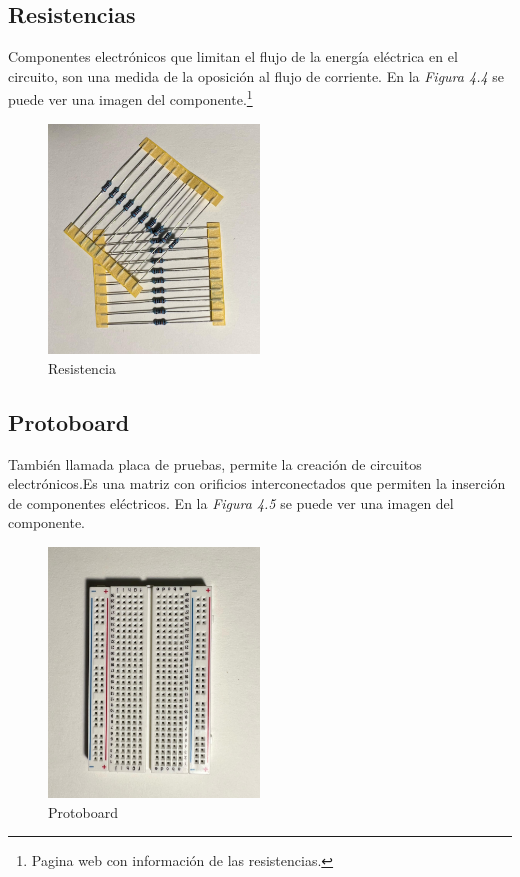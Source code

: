 \subsection{Resistencias}
Componentes electrónicos que limitan el flujo de la energía eléctrica en el circuito, son una medida de la oposición al flujo de corriente.  En la \textit{Figura 4.4} se puede ver una imagen del componente.\cite{Resistencia}\footnote{Pagina web con información de las resistencias\cite{Resistencia}.}
\begin{figure}[h]
        \centering
        \includegraphics[width=0.5\textwidth]{img/Resistencias.png}
        \caption{Resistencia}
        \label{fig:activforce}
    \end{figure}
    
\subsection{Protoboard}
También llamada placa de pruebas, permite la creación de circuitos electrónicos.Es una matriz con orificios interconectados que permiten la inserción de componentes eléctricos. En la \textit{Figura 4.5} se puede ver una imagen del componente.
\begin{figure}[h]
        \centering
        \includegraphics[angle=90,width=0.5\textwidth]{img/Protoboard.png}
        \caption{Protoboard}
        \label{fig:activforce}
    \end{figure}
